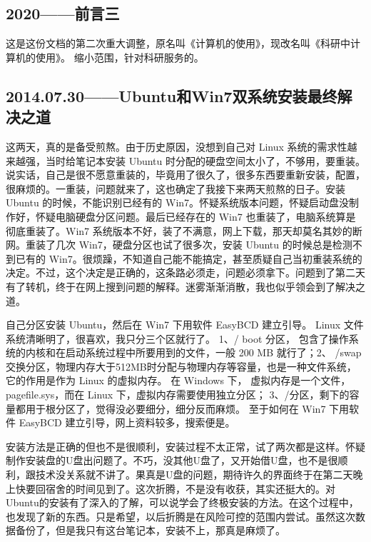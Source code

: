 \documentclass[cn,11pt,chinese,twoside]{elegantbook}
\begin{document}



\subsection*{2020——前言三}
这是这份文档的第二次重大调整，原名叫《计算机的使用》，现改名叫《科研中计算机的使用》。
缩小范围，针对科研服务的。



\subsection*{2014.07.30——Ubuntu和Win7双系统安装最终解决之道}
这两天，真的是备受煎熬。由于历史原因，没想到自己对 Linux 系统的需求性越来越强，当时给笔记本安装 Ubuntu 时分配的硬盘空间太小了，不够用，要重装。说实话，自己是很不愿意重装的，毕竟用了很久了，很多东西要重新安装，配置，很麻烦的。一重装，问题就来了，这也确定了我接下来两天煎熬的日子。安装 Ubuntu 的时候，不能识别已经有的 Win7。怀疑系统版本问题，怀疑启动盘没制作好，怀疑电脑硬盘分区问题。最后已经存在的 Win7 也重装了，电脑系统算是彻底重装了。Win7 系统版本不好，装了不满意，网上下载，那天却莫名其妙的断网。重装了几次 Win7，硬盘分区也试了很多次，安装 Ubuntu 的时候总是检测不到已有的 Win7。很烦躁，不知道自己能不能搞定，甚至质疑自己当初重装系统的决定。不过，这个决定是正确的，这条路必须走，问题必须拿下。问题到了第二天有了转机，终于在网上搜到问题的解释。迷雾渐渐消散，我也似乎领会到了解决之道。

自己分区安装 Ubuntu，然后在 Win7 下用软件 EasyBCD 建立引导。 Linux 文件系统清晰明了，很喜欢，我只分三个区就行了。 1、/ boot 分区， 包含了操作系统的内核和在启动系统过程中所要用到的文件，一般 200 MB 就行了；2、 /swap 交换分区，物理内存大于512MB时分配与物理内存等容量，也是一种文件系统，它的作用是作为 Linux 的虚拟内存。 在 Windows 下， 虚拟内存是一个文件， pagefile.sys，而在 Linux 下，虚拟内存需要使用独立分区； 3、/分区，剩下的容量都用于根分区了，觉得没必要细分，细分反而麻烦。 至于如何在 Win7 下用软件 EasyBCD 建立引导，网上资料较多，搜索便是。

安装方法是正确的但也不是很顺利，安装过程不太正常，试了两次都是这样。怀疑制作安装盘的U盘出问题了。不巧，没其他U盘了，又开始借U盘，也不是很顺利，跟技术没关系就不讲了。果真是U盘的问题，期待许久的界面终于在第二天晚上快要回宿舍的时间见到了。这次折腾，不是没有收获，其实还挺大的。对Ubuntu的安装有了深入的了解，可以说学会了终极安装的方法。在这个过程中，也发现了新的东西。只是希望，以后折腾是在风险可控的范围内尝试。虽然这次数据备份了，但是我只有这台笔记本，安装不上，那真是麻烦了。
\end{document}
